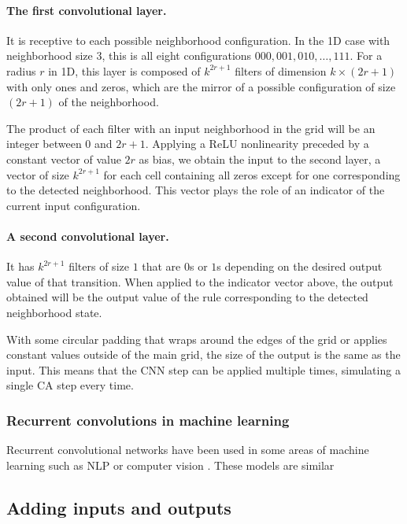 \paragraph{The first convolutional layer.} It is receptive to each possible
neighborhood configuration. In the 1D case with neighborhood size 3, this is all
eight configurations $000, 001, 010, \ldots, 111$. For a radius $r$ in 1D, this layer
is composed of $k^{2r + 1}$ filters of dimension $k \times (2r + 1)$ with only ones
and zeros, which are the mirror of a possible configuration of size $(2r+1)$ of
the neighborhood.

The product of each filter with an input neighborhood in the grid will be an
integer between $0$ and $2r + 1$. Applying a ReLU nonlinearity preceded by a
constant vector of value $2r$ as bias, we obtain the input to the second layer,
a vector of size $k^{2r + 1}$ for each cell containing all zeros except for
one corresponding to the detected neighborhood. This vector plays the role of an
indicator of the current input configuration.

\paragraph{A second convolutional layer.} It has $k^{2r + 1}$ filters of size $1$
that are $0$s or $1$s depending on the desired output value of that transition.
When applied to the indicator vector above, the output obtained will be the
output value of the rule corresponding to the detected neighborhood state.

With some circular padding that wraps around the edges of the grid or applies
constant values outside of the main grid, the size of the output is the same as
the input. This means that the CNN step can be applied multiple times, simulating a
single \ac{CA} step every time.

\subsubsection{Recurrent convolutions in machine learning}

Recurrent convolutional networks have been used in some areas of machine
learning such as NLP or computer vision
\parencite{pinheiroRecurrentConvolutionalNeural2014,
  laiRecurrentConvolutionalNeural2015}. These models are similar 

\subsection{Adding inputs and outputs\label{sec:adding-inputs-outp}}

